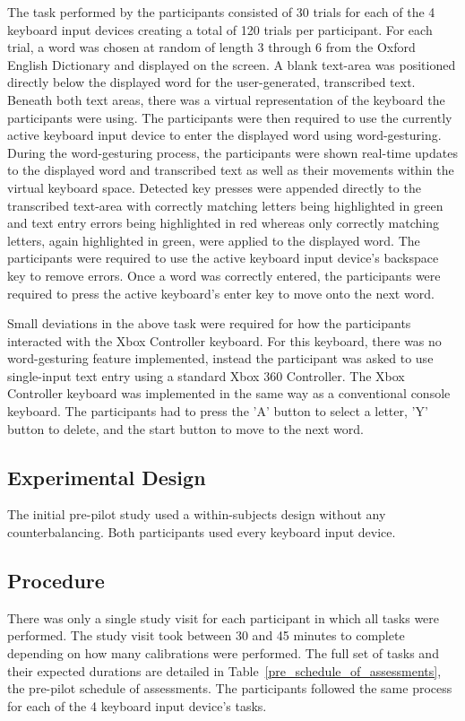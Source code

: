 The task performed by the participants consisted of 30 trials for each of the 4 keyboard input devices creating a total of 120 trials per participant. For each trial, a word was chosen at random of length 3 through 6 from the Oxford English Dictionary and displayed on the screen. A blank text-area was positioned directly below the displayed word for the user-generated, transcribed text. Beneath both text areas, there was a virtual representation of the keyboard the participants were using. The participants were then required to use the currently active keyboard input device to enter the displayed word using word-gesturing. During the word-gesturing process, the participants were shown real-time updates to the displayed word and transcribed text as well as their movements within the virtual keyboard space. Detected key presses were appended directly to the transcribed text-area with correctly matching letters being highlighted in green and text entry errors being highlighted in red whereas only correctly matching letters, again highlighted in green, were applied to the displayed word. The participants were required to use the active keyboard input device's backspace key to remove errors. Once a word was correctly entered, the participants were required to press the active keyboard's enter key to move onto the next word.

Small deviations in the above task were required for how the participants interacted with the Xbox Controller keyboard. For this keyboard, there was no word-gesturing feature implemented, instead the participant was asked to use single-input text entry using a standard Xbox 360 Controller. The Xbox Controller keyboard was implemented in the same way as a conventional console keyboard. The participants had to press the 'A' button to select a letter, 'Y' button to delete, and the start button to move to the next word.

\subsection{Experimental Design} \label{pre_experimental_design}
The initial pre-pilot study used a within-subjects design without any counterbalancing. Both participants used every keyboard input device.

\subsection{Procedure} \label{pre_procedure}
There was only a single study visit for each participant in which all tasks were performed. The study visit took between 30 and 45 minutes to complete depending on how many calibrations were performed. The full set of tasks and their expected durations are detailed in Table~\ref{pre_schedule_of_assessments}, the pre-pilot schedule of assessments. The participants followed the same process for each of the 4 keyboard input device's tasks.

